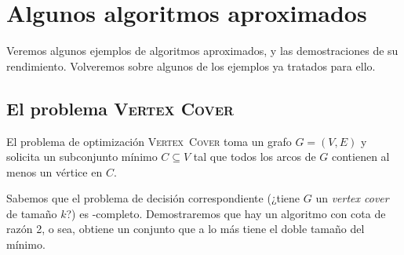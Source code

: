 \section{Algunos algoritmos aproximados}
\label{sec:algoritmos-aproximados}

  Veremos algunos ejemplos de algoritmos aproximados,
  y las demostraciones de su rendimiento.
  Volveremos sobre algunos de los ejemplos ya tratados para ello.

\subsection{El problema \textsc{Vertex Cover}}
\label{sec:aproximar-VC}

  El problema  de optimización \textsc{Vertex~Cover}
  toma un grafo \(G = (V, E)\)
  y solicita un subconjunto mínimo \(C \subseteq V\)
  tal que todos los arcos de \(G\) contienen al menos un vértice en \(C\).

  Sabemos que el problema de decisión correspondiente
  (¿tiene \(G\) un \emph{\foreignlanguage{english}{vertex cover}}
   de tamaño \(k\)?)
  es \NP\nobreakdash-completo.
  Demostraremos que hay un algoritmo con cota de razón \num{2},
  o sea,
  obtiene un conjunto que a lo más tiene el doble tamaño del mínimo.

